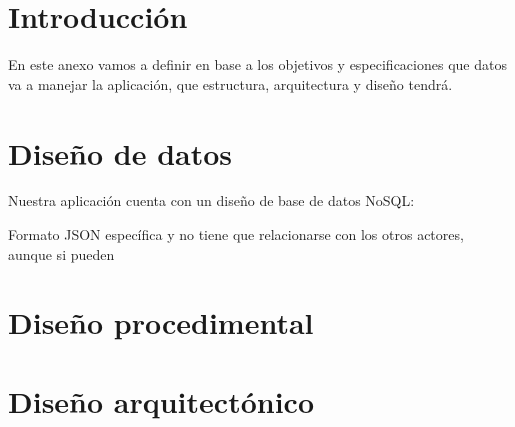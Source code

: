 
\section{Introducción}
En este anexo vamos a definir en base a los objetivos y especificaciones que datos va a manejar la aplicación, que estructura, arquitectura y diseño tendrá.

\section{Diseño de datos}
Nuestra aplicación cuenta con un diseño de base de datos NoSQL:


Formato JSON 
específica y no tiene que relacionarse con los otros actores, aunque si pueden 

\section{Diseño procedimental}

\section{Diseño arquitectónico}


